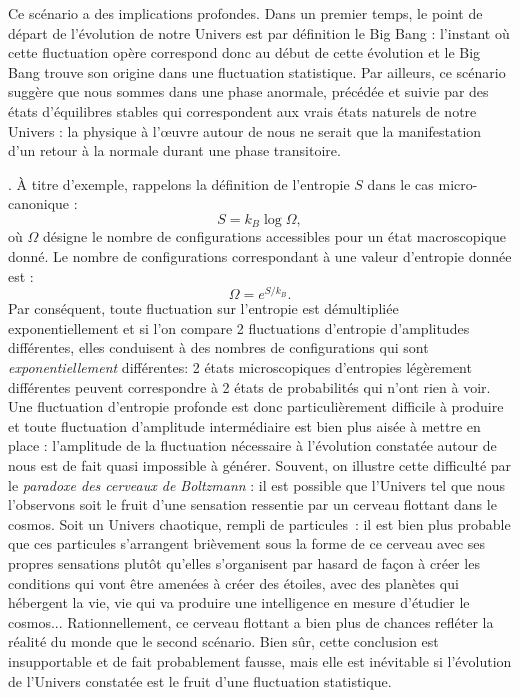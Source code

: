 Ce scénario a des implications profondes. Dans un premier temps, le point de départ de l'évolution de notre Univers est par définition le Big Bang : l'instant où cette fluctuation opère correspond donc au début de cette évolution et le Big Bang trouve son origine dans une fluctuation statistique. Par ailleurs, ce scénario suggère que nous sommes dans une phase anormale, précédée et suivie par des états d'équilibres stables qui correspondent aux vrais états naturels de notre Univers : la physique à l'œuvre autour de nous ne serait que la manifestation d'un retour à la normale durant une phase transitoire.

. À titre d'exemple, rappelons la définition de l'entropie $S$ dans le cas micro-canonique :
\begin{equation}
S=k_B\log{\Omega},
\end{equation}
où $\Omega$ désigne le nombre de configurations accessibles pour un état macroscopique donné. Le nombre de configurations correspondant à une valeur d'entropie donnée est :
\begin{equation}
\Omega=e^{S/k_B}.
\end{equation}
Par conséquent, toute fluctuation sur l'entropie est démultipliée exponentiellement et si l’on compare 2 fluctuations d'entropie d'amplitudes différentes, elles conduisent à des nombres de configurations qui sont \textit{exponentiellement} différentes: 2 états microscopiques d'entropies légèrement différentes peuvent correspondre à 2 états de probabilités qui n'ont rien à voir. Une fluctuation d'entropie profonde est donc particulièrement difficile à produire et toute fluctuation d'amplitude intermédiaire est bien plus aisée à mettre en place : l'amplitude de la fluctuation nécessaire à l'évolution constatée autour de nous est de fait quasi impossible à générer. Souvent, on illustre cette difficulté par le \textit{paradoxe des cerveaux de Boltzmann} : il est possible que l'Univers tel que nous l'observons soit le fruit d'une sensation ressentie par un cerveau flottant dans le cosmos. Soit un Univers chaotique, rempli de particules~: il est bien plus probable que ces particules s'arrangent brièvement sous la forme de ce cerveau avec ses propres sensations plutôt qu'elles s'organisent par  hasard de façon à créer les conditions qui vont être amenées à créer des étoiles, avec des planètes qui hébergent la vie, vie qui va produire une intelligence en mesure d'étudier le cosmos... Rationnellement, ce cerveau flottant a bien plus de chances refléter la réalité du monde que le second scénario. Bien sûr, cette conclusion est insupportable et de fait probablement fausse, mais elle est inévitable si l'évolution de l'Univers constatée est le fruit d'une fluctuation statistique.

